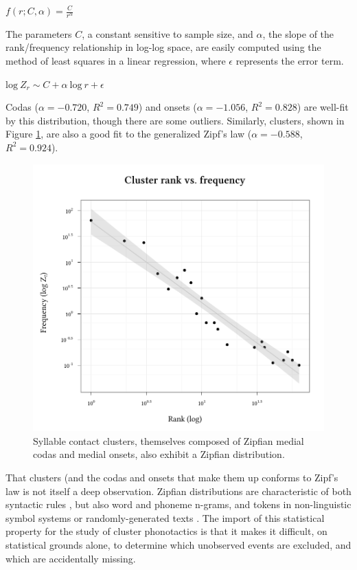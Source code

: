 \begin{example}
$\displaystyle f(r; C, \alpha) = \frac{C}{r^\alpha}$ 
\end{example}

\noindent
The parameters $C$, a constant sensitive to sample size, and $\alpha$, the slope of the rank/frequency relationship in log-log space, are easily computed using the method of least squares in a linear regression, where $\epsilon$ represents the error term.

\begin{example}
$\displaystyle \textrm{log}~Z_r \sim C + \alpha~\textrm{log}~r + \epsilon$ 
\end{example}

\noindent
Codas ($\alpha = -0.720$, $R^2 = 0.749$) and onsets ($\alpha = -1.056$, $R^2 = 0.828$) are well-fit by this distribution, though there are some outliers. Similarly, clusters, shown in Figure \ref{clus}, are also a good fit to the generalized Zipf's law ($\alpha = -0.588$, $R^2 = 0.924$). 

\begin{figure}
\centering
\includegraphics{cluster.pdf}
\caption{Syllable contact clusters, themselves composed of Zipfian medial codas and medial onsets, also exhibit a Zipfian distribution.}
\label{clus}
\end{figure}

That clusters (and the codas and onsets that make them up conforms to Zipf's law is not itself a deep observation. Zipfian distributions are characteristic of both syntactic rules \citep{Yang2009}, but also word \citep{Teahan1998,Ha2002,Baroni2009} and phoneme \citep{Daland2011a} n-grams, and tokens in non-linguistic symbol systems \citep{Chomsky1958,Sproat2010} or randomly-generated texts \citep{Miller1957,Li1992}. The import of this statistical property for the study of cluster phonotactics is that it makes it difficult, on statistical grounds alone, to determine which unobserved events are excluded, and which are accidentally missing. 


